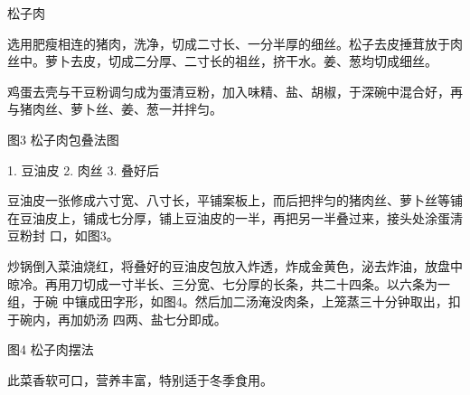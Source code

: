 \begin{recipe}{松子肉}

\ingredients


\cooking

\step 选用肥瘦相连的猪肉，洗净，切成二寸长、一分半厚的细丝。松子去皮捶茸放于肉
丝中。萝卜去皮，切成二分厚、二寸长的祖丝，挤干水。姜、葱均切成细丝。

\step 鸡蛋去壳与干豆粉调匀成为蛋清豆粉，加入味精、盐、胡椒，于深碗中混合好，再
与猪肉丝、萝卜丝、姜、葱一并拌匀。

图3 松子肉包叠法图

1. 豆油皮 2. 肉丝 3. 叠好后

\step 豆油皮一张修成六寸宽、八寸长，平铺案板上，而后把拌匀的猪肉丝、萝卜丝等铺
在豆油皮上，铺成七分厚，铺上豆油皮的一半，再把另一半叠过来，接头处涂蛋淸豆粉封
口，如图3。

\step 炒锅倒入菜油烧红，将叠好的豆油皮包放入炸透，炸成金黄色，泌去炸油，放盘中
晾冷。再用刀切成一寸半长、三分宽、七分厚的长条，共二十四条。以六条为一组，于碗
中镶成田字形，如图4。然后加二汤淹没肉条，上笼蒸三十分钟取出，扣于碗内，再加奶汤
四两、盐七分即成。

图4 松子肉摆法

\notes

此菜香软可口，营养丰富，特别适于冬季食用。

\end{recipe}

